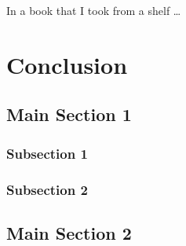 
\begin{savequote}[45mm]
In a book that I took from a shelf \ldots
{}
\end{savequote}

\chapter{Conclusion} %

\label{Chapter8} %


\section{Main Section 1}

\subsection{Subsection 1}


\subsection{Subsection 2}


\section{Main Section 2}
